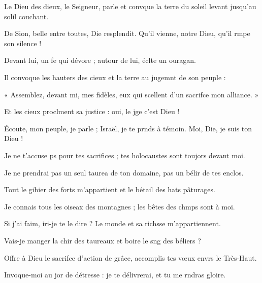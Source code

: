\item Le Dieu des dieux, le Seigneur, parle et convque la terre\psstar{} du soleil levant jusqu’au solil couchant.
\item De Sion, belle entre toutes, Die resplendit.\psstar{} Qu’il vienne, notre Dieu, qu’il rmpe son silence ! 
\item Devant lui, un fe qui dévore ;\psstar{} autour de lui, éclte un ouragan.
\item Il convoque les hauters des cieux\psstar{} et la terre au jugemnt de son peuple :
\item « Assemblez, devant mi, mes fidèles,\psstar{} eux qui scellent d’un sacrifce mon alliance. »
\item Et les cieux proclment sa justice :\psstar{} oui, le jge c’est Dieu !
\item Écoute, mon peuple, je parle ;\pscross{} Israël, je te prnds à témoin.\psstar{} Moi, Die, je suis ton Dieu !
\item Je ne t’accuse ps pour tes sacrifices ;\psstar{} tes holocaustes sont toujors devant moi.
\item Je ne prendrai pas un seul taurea de ton domaine,\psstar{} pas un bélir de tes enclos.
\item Tout le gibier des forts m’appartient\psstar{} et le bétail des hats pâturages.
\item Je connais tous les oiseax des montagnes ;\psstar{} les bêtes des chmps sont à moi.
\item Si j’ai faim, iri-je te le dire ?\psstar{} Le monde et sa richsse m’appartiennent.
\item Vais-je manger la chir des taureaux\psstar{} et boire le sng des béliers ?
\item Offre à Dieu le sacrifce d’action de grâce,\psstar{} accomplis tes vœux envrs le Très-Haut.
\item Invoque-moi au jor de détresse :\psstar{} je te délivrerai, et tu me rndras gloire.